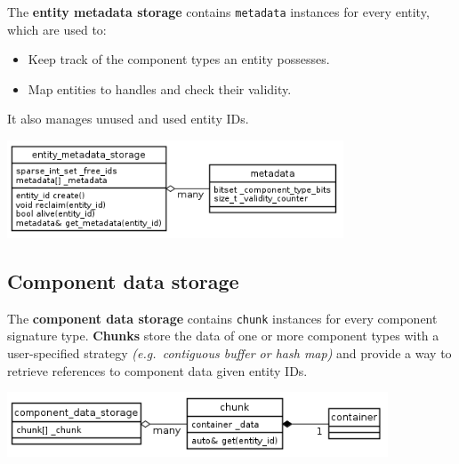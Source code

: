 \documentclass[twoside, 12pt, a4paper, openany]{book}
\let\origfigure=\figure
\let\endorigfigure=\endfigure
\renewenvironment{figure}[1][]{%
\origfigure[H]
}{%
\endorigfigure
}
\begin{document}
The \textbf{entity metadata storage} contains
\texttt{metadata}
instances for every entity, which are used to:

\begin{itemize}
\item
  Keep track of the component types an entity possesses.
\item
  Map entities to handles and check their validity.
\end{itemize}

It also manages unused and used entity IDs.

\begin{figure}[htbp]
\centering
\includegraphics[width=0.75000\textwidth]{source/figures/generated/ecst/architecture/entity_metadata_storage.png}
\caption{ECST architecture: entity metadata storage}
\end{figure}

\subsection{Component data storage}\label{component-data-storage}

The \textbf{component data storage} contains
\texttt{chunk}
instances for every component signature type. \textbf{Chunks} store the
data of one or more component types with a user-specified strategy
\emph{(e.g.~contiguous buffer or hash map)} and provide a way to
retrieve references to component data given entity IDs.

\begin{figure}[htbp]
\centering
\includegraphics[width=0.85000\textwidth]{source/figures/generated/ecst/architecture/component_data_storage.png}
\caption{ECST architecture: component data storage}
\end{figure}
\end{document}
